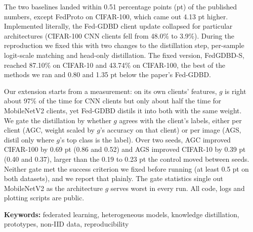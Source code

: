 \documentclass[12pt,a4paper,oneside,openany]{report}
\numberwithin{equation}{chapter}
\begin{document}
The two baselines landed within 0.51 percentage points (pt) of the published numbers, except FedProto on CIFAR-100, which came out 4.13 pt higher. Implemented literally, the Fed-GDBD client update collapsed for particular architectures (CIFAR-100 CNN clients fell from 48.0\% to 3.9\%). During the reproduction we fixed this with two changes to the distillation step, per-sample logit-scale matching and head-only distillation. The fixed version, FedGDBD-S, reached 87.10\% on CIFAR-10 and 43.74\% on CIFAR-100, the best of the methods we ran and 0.80 and 1.35 pt below the paper's Fed-GDBD.

Our extension starts from a measurement: on its own clients' features, $g$ is right about 97\% of the time for CNN clients but only about half the time for MobileNetV2 clients, yet Fed-GDBD distils it into both with the same weight. We gate the distillation by whether $g$ agrees with the client's labels, either per client (AGC, weight scaled by $g$'s accuracy on that client) or per image (AGS, distil only where $g$'s top class is the label). Over two seeds, AGC improved CIFAR-100 by 0.69 pt (0.86 and 0.52) and AGS improved CIFAR-10 by 0.39 pt (0.40 and 0.37), larger than the 0.19 to 0.23 pt the control moved between seeds. Neither gate met the success criterion we fixed before running (at least 0.5 pt on both datasets), and we report that plainly. The gate statistics single out MobileNetV2 as the architecture $g$ serves worst in every run. All code, logs and plotting scripts are public.

\vspace{1em}
\noindent\textbf{Keywords:} federated learning, heterogeneous models, knowledge distillation, prototypes, non-IID data, reproducibility

\clearpage
\tableofcontents
\clearpage
{}
\listoffigures
\clearpage
{}
\listoftables
\clearpage
\end{document}
